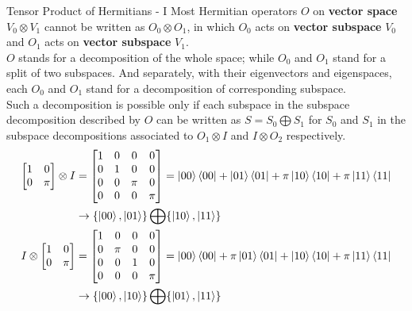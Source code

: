 \documentclass{beamer}
\begin{document}
\begin{frame}{Tensor Product of Hermitians - I}
  {\tiny
    Most Hermitian operators $O$ on \textbf{vector space} $V_0 \otimes V_1$ cannot be written
    as $O_0 \otimes O_1$,
    in which $O_0$ acts on \textbf{vector subspace} $V_0$ and $O_1$ acts on \textbf{vector subspace} $V_1$. \\
    $O$ stands for a decomposition of the whole space;
    while $O_0$ and $O_1$ stand for a split of two subspaces.
    And separately, with their eigenvectors and eigenspaces,
    each $O_0$ and $O_1$ stand for a decomposition of corresponding subspace. \\
    Such a decomposition is possible only if each subspace in the subspace decomposition described by $O$
    can be written as $S = S_0 \bigoplus S_1$
    for $S_0$ and $S_1$ in the subspace decompositions associated to $O_1 \otimes I$ and $I \otimes O_2$ respectively. \\
    \begin{align*}
      \begin{bmatrix} 
        1 & 0 \\
        0 & \pi
      \end{bmatrix} \otimes I
      &=
      \begin{bmatrix}
        1 & 0 & 0 & 0 \\
        0 & 1 & 0 & 0 \\
        0 & 0 & \pi & 0 \\
        0 & 0 & 0 & \pi 
      \end{bmatrix}
      = \ket{00} \bra{00} + \ket{01} \bra{01} + \pi \ket{10} \bra{10} + \pi \ket{11} \bra{11} \\
      & \rightarrow \{\ket{00}, \ket{01}\} \bigoplus \{\ket{10}, \ket{11}\} \\
      I \otimes
      \begin{bmatrix} 
        1 & 0 \\
        0 & \pi
      \end{bmatrix}
      &=
      \begin{bmatrix}
        1 & 0 & 0 & 0 \\
        0 & \pi & 0 & 0 \\
        0 & 0 & 1 & 0 \\
        0 & 0 & 0 & \pi 
      \end{bmatrix}
      = \ket{00} \bra{00} + \pi \ket{01} \bra{01} + \ket{10} \bra{10} + \pi \ket{11} \bra{11} \\
      & \rightarrow \{\ket{00}, \ket{10}\} \bigoplus \{\ket{01}, \ket{11}\}
    \end{align*}
  }%
\end{frame}
\end{document}
